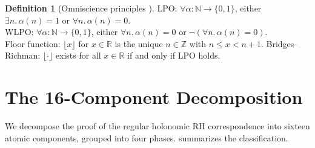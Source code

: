 \documentclass[11pt,a4paper]{article}
\theoremstyle{plain}
\theoremstyle{definition}
\newtheorem{definition}[theorem]{Definition}
\newcommand{\WLPO}{\textsf{WLPO}}
\newcommand{\LPO}{\textsf{LPO}}
\newcommand{\Z}{\mathbb{Z}}
\newcommand{\R}{\mathbb{R}}
\newcommand{\N}{\mathbb{N}}
\begin{document}
\begin{definition}[Omniscience principles {\cite{BridgesRichman1987}}]\label{def:omniscience}
\LPO: $\forall \alpha : \N \to \{0,1\}$, either $\exists n.\, \alpha(n) = 1$ or $\forall n.\, \alpha(n) = 0$.\\
\WLPO: $\forall \alpha : \N \to \{0,1\}$, either $\forall n.\, \alpha(n) = 0$ or $\lnot(\forall n.\, \alpha(n) = 0)$.\\
Floor function: $\lfloor x \rfloor$ for $x \in \R$ is the unique $n \in \Z$ with $n \le x < n+1$.
Bridges--Richman: $\lfloor \cdot \rfloor$ exists for all $x \in \R$ if and only if \LPO{} holds.
\end{definition}

\section{The 16-Component Decomposition}

We decompose the proof of the regular holonomic RH correspondence into sixteen atomic components, grouped into four phases.
 summarizes the classification.
\end{document}
